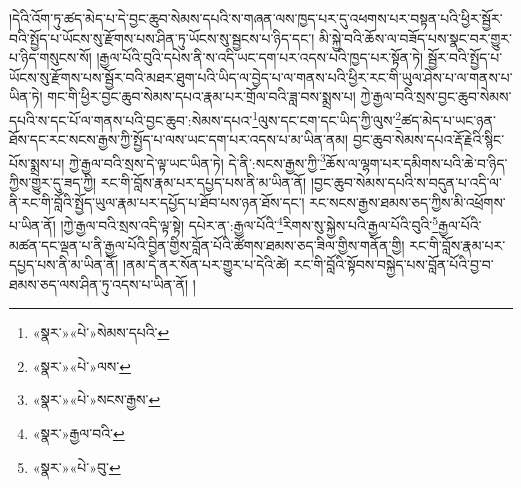 །དེའི་འོག་ཏུ་ཚད་མེད་པ་དེ་བྱང་ཆུབ་སེམས་དཔའི་ས་གཞན་ལས་ཁྱད་པར་དུ་འཕགས་པར་བསྟན་པའི་ཕྱིར་སྦྱོར་བའི་སྤྱོད་པ་ཡོངས་སུ་རྫོགས་པས་ཤིན་ཏུ་ཡོངས་སུ་སྦྱངས་པ་ཉིད་དང་། མི་སྐྱེ་བའི་ཆོས་ལ་བཟོད་པས་སྣང་བར་གྱུར་པ་ཉིད་གསུངས་སོ། །རྒྱལ་པོའི་བུའི་དཔེས་ནི་ས་འདི་ཡང་དག་པར་འདས་པའི་ཁྱད་པར་སྟོན་ཏེ། སྦྱོར་བའི་སྤྱོད་པ་ཡོངས་སུ་རྫོགས་པས་སྦྱོར་བའི་མཐར་ཐུག་པའི་ཡིད་ལ་བྱེད་པ་ལ་གནས་པའི་ཕྱིར་རང་གི་ཡུལ་ཤེས་པ་ལ་གནས་པ་ཡིན་ཏེ། གང་གི་ཕྱིར་བྱང་ཆུབ་སེམས་དཔའ་རྣམ་པར་གྲོལ་བའི་ཟླ་བས་སྨྲས་པ། ཀྱེ་རྒྱལ་བའི་སྲས་བྱང་ཆུབ་སེམས་དཔའི་ས་དང་པོ་ལ་གནས་པའི་བྱང་ཆུབ་:སེམས་དཔའ་\footnote{«སྣར་»«པེ་»སེམས་དཔའི་}ལུས་དང་ངག་དང་ཡིད་ཀྱི་ལུས་\footnote{«སྣར་»«པེ་»ལས་}ཚད་མེད་པ་ཡང་ཉན་ཐོས་དང་རང་སངས་རྒྱས་ཀྱི་སྤྱོད་པ་ལས་ཡང་དག་པར་འདས་པ་མ་ཡིན་ནམ། བྱང་ཆུབ་སེམས་དཔའ་རྡོ་རྗེའི་སྙིང་པོས་སྨྲས་པ། ཀྱེ་རྒྱལ་བའི་སྲས་དེ་ལྟ་ཡང་ཡིན་ཏེ། དེ་ནི་:སངས་རྒྱས་ཀྱི་\footnote{«སྣར་»«པེ་»སངས་རྒྱས་}ཆོས་ལ་ལྷག་པར་དམིགས་པའི་ཆེ་བ་ཉིད་ཀྱིས་གྱུར་དུ་ཟད་ཀྱི། རང་གི་བློས་རྣམ་པར་དཔྱད་པས་ནི་མ་ཡིན་ནོ། །བྱང་ཆུབ་སེམས་དཔའི་ས་བདུན་པ་འདི་ལ་ནི་རང་གི་བློའི་སྤྱོད་ཡུལ་རྣམ་པར་དཔྱོད་པ་ཐོབ་པས་ཉན་ཐོས་དང་། རང་སངས་རྒྱས་ཐམས་ཅད་ཀྱིས་མི་འཕྲོགས་པ་ཡིན་ནོ། །ཀྱེ་རྒྱལ་བའི་སྲས་འདི་ལྟ་སྟེ། དཔེར་ན་:རྒྱལ་པོའི་\footnote{«སྣར་»རྒྱལ་བའི་}རིགས་སུ་སྐྱེས་པའི་རྒྱལ་པོའི་བུའི་\footnote{«སྣར་»«པེ་»བུ་}རྒྱལ་པོའི་མཚན་དང་ལྡན་པ་ནི་རྒྱལ་པོའི་བྱིན་གྱིས་བློན་པོའི་ཚོགས་ཐམས་ཅད་ཟིལ་གྱིས་གནོན་གྱི། རང་གི་བློས་རྣམ་པར་དཔྱད་པས་ནི་མ་ཡིན་ནོ། །ནམ་དེ་ནར་སོན་པར་གྱུར་པ་དེའི་ཚེ། རང་གི་བློའི་སྟོབས་བསྐྱེད་པས་བློན་པོའི་བྱ་བ་ཐམས་ཅད་ལས་ཤིན་ཏུ་འདས་པ་ཡིན་ནོ། །
